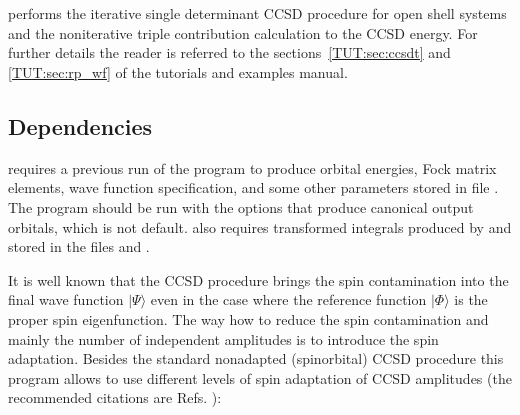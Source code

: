 \section{}
\label{sec:ccsdt}
 performs the iterative single determinant CCSD procedure for
open shell systems and the noniterative triple contribution calculation to
the CCSD energy.
For further details the reader is referred to the
sections~\ref{TUT:sec:ccsdt} and
\ref{TUT:sec:rp_wf} of the tutorials and examples manual.

\subsection{Dependencies}
\label{sec:ccsort_dependencies}

 requires a previous run of the  program
to produce orbital energies, Fock matrix elements, wave function
specification, and some other parameters stored in file .
The  program should be run with the options that produce
canonical output orbitals, which is not default.
 also requires transformed integrals produced by 
and stored in the files  and .

It is well known that the CCSD procedure brings the spin
contamination into the final
wave function ${|\Psi \rangle}$ even in the case where the reference function
${|\Phi\rangle}$ is the proper
spin eigenfunction. The way how to reduce the spin
contamination and mainly the number of independent amplitudes is to introduce
the spin adaptation.
Besides the standard nonadapted (spinorbital) CCSD procedure this program
allows to use different levels of spin
adaptation of CCSD amplitudes (the recommended citations are Refs.
\cite{ccsd_neo2,ccsd_neo1}):

